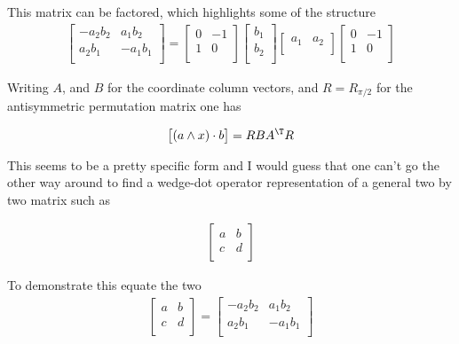 This matrix can be factored, which highlights some of the structure
\begin{align}\label{eqn:matrix_to_operator:matrixOfOperator}
\begin{bmatrix}
- a_2 b_2 & a_1 b_2  \\
a_2 b_1 & -a_1 b_1 \\
\end{bmatrix}
=
\begin{bmatrix}
0 & -1 \\
1 & 0 \\
\end{bmatrix}
\begin{bmatrix}
b_1 \\
b_2 \\
\end{bmatrix}
\begin{bmatrix}
a_1 & a_2 \\
\end{bmatrix}
\begin{bmatrix}
0 & -1 \\
1 & 0 \\
\end{bmatrix}
\end{align}

Writing $A$, and $B$ for the coordinate column vectors, and $R = R_{\pi/2}$ for the antisymmetric permutation matrix one has 

\begin{align*}
\begin{bmatrix}
(a \wedge x) \cdot b
\end{bmatrix}
=
R B A^\T R
\end{align*}

This seems to be a pretty specific form and I would guess that one can't go the other way around to find a wedge-dot operator representation of a general two by two matrix such as

\begin{align*}
\begin{bmatrix}
a & b \\
c & d \\
\end{bmatrix}
\end{align*}

To demonstrate this equate the two
\begin{align*}
\begin{bmatrix}
a & b \\
c & d \\
\end{bmatrix}
=
\begin{bmatrix}
- a_2 b_2 & a_1 b_2  \\
a_2 b_1 & -a_1 b_1 \\
\end{bmatrix}
\end{align*}

